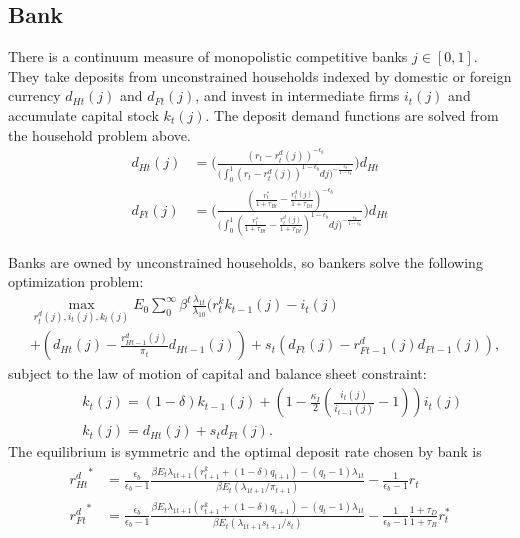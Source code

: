 \documentclass[12pt]{article}
\begin{document}
\subsection{Bank}
There is a continuum measure of monopolistic competitive banks $j \in [0,1]$. They take deposits from unconstrained households indexed by domestic or foreign currency $d_{Ht}(j)$ and $d_{Ft}(j)$, and invest in intermediate firms $i_t(j)$ and accumulate capital stock $k_t(j)$. The deposit demand functions are solved from the household problem above. 
\begin{align*}
d_{Ht}(j) &= \Biggl(\frac{(r_t-r_t^d(j))^{-\epsilon_b}}{\big(\int_0^1(r_t-r_t^d(j))^{1-\epsilon_b}dj\big)^{-\frac{\epsilon_b}{1-\epsilon_b}}}\Biggl)d_{Ht} \\
d_{Ft}(j) &= \Biggl(\frac{(\frac{r_t^*}{1+\tau_{Bt}}-\frac{r_t^d(j)}{1+\tau_{Dt}})^{-\epsilon_b}}{\big(\int_0^1(\frac{r_t^*}{1+\tau_{Bt}}-\frac{r_t^d(j)}{1+\tau_{Dt}})^{1-\epsilon_b}dj\big)^{-\frac{\epsilon_b}{1-\epsilon_b}}}\Biggl)d_{Ht}
\end{align*}

Banks are owned by unconstrained households, so bankers solve the following optimization problem: 
\begin{align*}
 &\max_{r_t^d(j),i_t(j),k_t(j)}E_0 \sum_0^{\infty}\beta^t\frac{\lambda_{1t}}{\lambda_{10}}(r_t^kk_{t-1}(j)-i_t(j) \\
 &+(d_{Ht}(j)-\frac{r_{Ht-1}^d(j)}{\pi_t}d_{Ht-1}(j))+s_t(d_{Ft}(j)-r_{Ft-1}^d(j)d_{Ft-1}(j)),
 \end{align*}
subject to the law of motion of capital and balance sheet constraint: 
 \begin{align*}
  \quad & k_t(j) = (1-\delta)k_{t-1}(j)+(1-\frac{\kappa_I}{2}(\frac{i_t(j)}{i_{t-1}(j)}-1))i_t(j) \\
& k_t(j) = d_{Ht}(j)+s_td_{Ft}(j).
\end{align*}
The equilibrium is symmetric and the optimal deposit rate chosen by bank is 
\begin{align*}
{r_{Ht}^d}^* &= \frac{\epsilon_b}{\epsilon_b-1}\frac{\beta E_t \lambda_{1t+1}(r_{t+1}^k+(1-\delta)q_{t+1})-(q_t-1)\lambda_{1t}}{\beta E_t (\lambda_{1t+1}/\pi_{t+1})}-\frac{1}{\epsilon_b-1}r_t \\
{r_{Ft}^d}^* &= \frac{\epsilon_b}{\epsilon_b-1}\frac{\beta E_t \lambda_{1t+1}(r_{t+1}^k+(1-\delta)q_{t+1})-(q_t-1)\lambda_{1t}}{\beta E_t (\lambda_{1t+1}s_{t+1}/s_t)}-\frac{1}{\epsilon_b-1}\frac{1+\tau_D}{1+\tau_B}r_t^*
\end{align*}
\end{document}
